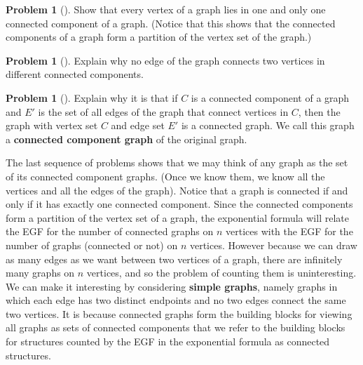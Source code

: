 \documentclass[10pt,]{book}
\newcommand{\terminology}[1]{\textbf{#1}}
\theoremstyle{plain}
\theoremstyle{definition}
\newtheorem{activity}[project]{Problem}
\theoremstyle{definition}
\numberwithin{equation}{chapter}
\begin{document}
\begin{activity}[] \label{activity-418}
\hypertarget{p-2193}{}%
Show that every vertex of a graph lies in one and only one connected component of a graph. (Notice that this shows that the connected components of a graph form a partition of the vertex set of the graph.)%
\end{activity}
\begin{activity}[] \label{activity-419}
\hypertarget{p-2198}{}%
Explain why no edge of the graph connects two vertices in different connected components.%
\end{activity}
\begin{activity}[] \label{activity-420}
\hypertarget{p-2200}{}%
Explain why it is that if \(C\) is a connected component of a graph and \(E'\) is the set of all edges of the graph that connect vertices in \(C\), then the graph with vertex set \(C\) and edge set \(E'\) is a connected graph. We call this graph a \terminology{connected component graph} of the original graph.%
\end{activity}
\hypertarget{p-2202}{}%
The last sequence of problems shows that we may think of any graph as the set of its connected component graphs. (Once we know them, we know all the vertices and all the edges of the graph). Notice that a graph is connected if and only if it has exactly one connected component. Since the connected components form a partition of the vertex set of a graph, the exponential formula will relate the EGF for the number of connected graphs on \(n\) vertices with the EGF for the number of graphs (connected or not) on \(n\) vertices. However because we can draw as many edges as we want between two vertices of a graph, there are infinitely many graphs on \(n\) vertices, and so the problem of counting them is uninteresting. We can make it interesting by considering \terminology{simple graphs}, namely graphs in which each edge has two distinct endpoints and no two edges connect the same two vertices. It is because connected graphs form the building blocks for viewing all graphs as sets of connected components that we refer to the building blocks for structures counted by the EGF in the exponential formula as connected structures.%
\end{document}
